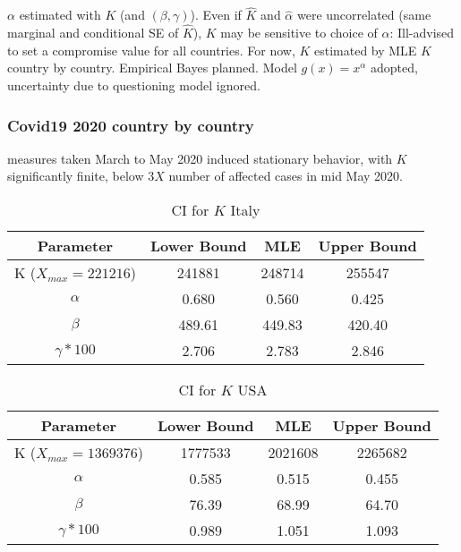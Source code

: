 \documentclass[notes]{beamer}
\begin{document}
\begin{frame}
    \noindent $\alpha$ estimated with $K$ (and $(\beta, \gamma)$). Even if $\hat{K}$ and $\hat{\alpha}$ were uncorrelated (same marginal and conditional SE of $\hat{K}$), $K$ may be sensitive to choice of $\alpha$:  Ill-advised to set a compromise value for all countries.
    \noindent For now, $K$ estimated by MLE $\hat{K}$ country by country. Empirical Bayes planned.
    \noindent Model $g(x)=x^\alpha$ adopted, uncertainty due to  questioning model ignored.
\end{frame}
\begin{frame}
\frametitle{Covid19 2020 country by country}
      measures taken March to May 2020 induced stationary behavior, with $K$ significantly finite, below $3X$  number of affected cases in mid May 2020.
\begin{table}[ht]
    \centering
    \begin{tabular}{|c|c|c|c|}
         \hline
    Parameter  & Lower Bound & MLE & Upper Bound  \\   
         \hline
    K ($X_{max} = 221216$) &  241881 & 248714 &  255547 \\        
         \hline
    $\alpha$ &  0.680 & 0.560 & 0.425 \\        
         \hline
    $\beta$ & 489.61 & 449.83 & 420.40 \\
         \hline
    $\gamma * 100$ &2.706 & 2.783 & 2.846 \\
         \hline
    \end{tabular}
    \caption{CI for $K$ Italy}
    \label{tab:ci_italy}
\end{table}

\begin{table}[ht]
    \centering
    \begin{tabular}{|c|c|c|c|}
         \hline
    Parameter  & Lower Bound & MLE & Upper Bound    \\ 
         \hline
    K ($X_{max} = 1369376$) &  1777533 & 2021608  & 2265682 \\        
              \hline
  $\alpha$ &  0.585 & 0.515 & 0.455 \\        
         \hline
    $\beta$ & 76.39 & 68.99 & 64.70 \\
         \hline
    $\gamma * 100$ & 0.989 & 1.051 & 1.093 \\
         \hline
    \end{tabular}
    \caption{CI for $K$ USA}
    \label{tab:ci_usa}
\end{table}
\end{frame}
\end{document}
